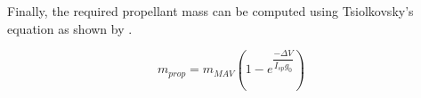 
\noindent
Finally, the required propellant mass can be computed using Tsiolkovsky's equation as shown by .

\begin{equation} \label{eq:propellantMass}
m_{prop} = m_{MAV}\left(1-e^{\dfrac{-\Delta V}{I_{sp}g_{0}}}\right)
\end{equation}

%

%
